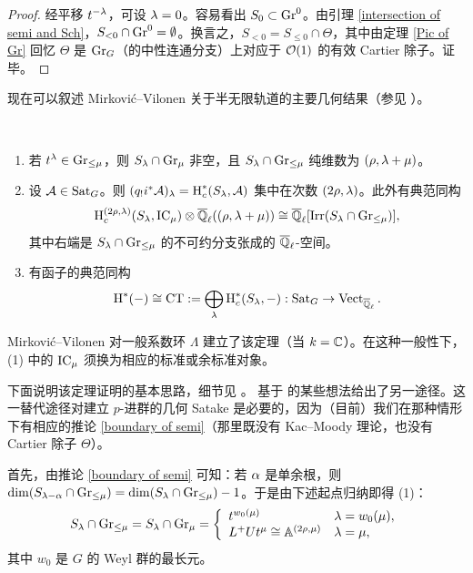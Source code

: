 \begin{proof}
经平移 $t^{-{\lambda}}$，可设 ${\lambda}=0$。容易看出 $S_0\subset {\operatorname{Gr}}^0$。由引理 \ref{intersection of semi and Sch}，$S_{<0}\cap {\operatorname{Gr}}^0=\emptyset$。换言之，$S_{<0}=S_{\leq 0}\cap \Theta$，其中由定理 \ref{Pic of Gr} 回忆 $\Theta$ 是 ${\operatorname{Gr}}_G$（的中性连通分支）上对应于 ${\mathcal O}(1)$ 的有效 Cartier 除子。证毕。
\end{proof}

现在可以叙述 Mirkovi\'c--Vilonen 关于半无限轨道的主要几何结果（参见 \cite[\S\ 3]{MV}）。

\begin{thm}\label{MV theory}~
\begin{enumerate}
\item 若 $t^{\lambda}\in {\operatorname{Gr}}_{\leq \mu}$，则 $S_{\lambda}\cap {\operatorname{Gr}}_\mu$ 非空，且 $S_{\lambda} \cap {\operatorname{Gr}}_{\leq \mu}$ 纯维数为 $(\rho,{\lambda}+\mu)$。

\item 设 ${\mathcal A}\in{\operatorname{Sat}}_G$。则 $(q_!i^*{\mathcal A})_{\lambda}=\operatorname{H}_c^*(S_{\lambda}, {\mathcal A})$ 集中在次数 $(2\rho,{\lambda})$。此外有典范同构
\[\operatorname{H}_c^{(2\rho,{\lambda})}(S_{\lambda}, {\operatorname{IC}}_\mu)\otimes{\overline{{\mathbb Q}}_\ell}((\rho,{\lambda}+\mu))\cong {\overline{{\mathbb Q}}_\ell}[\operatorname{Irr}(S_{\lambda}\cap{\operatorname{Gr}}_{\leq \mu})],\]
其中右端是 $S_{\lambda}\cap{\operatorname{Gr}}_{\leq \mu}$ 的不可约分支张成的 ${\overline{{\mathbb Q}}_\ell}$-空间。

\item 有函子的典范同构
\[\operatorname{H}^*(-)\cong \operatorname{CT}:=\bigoplus_{\lambda} \operatorname{H}_c^*(S_{\lambda},-):{\operatorname{Sat}}_G\to \operatorname{Vect}_{{\overline{{\mathbb Q}}_\ell}}.\]
\end{enumerate}
\end{thm}

\begin{rmk}
Mirkovi\'c--Vilonen 对一般系数环 $\Lambda$ 建立了该定理（当 $k={\mathbb C}$）。在这种一般性下，(1) 中的 ${\operatorname{IC}}_\mu$ 须换为相应的标准或余标准对象。
\end{rmk}

下面说明该定理证明的基本思路，细节见 \cite[\S\ 3]{MV}。\cite[\S~2.2]{Z14} 基于 \cite{NP} 的某些想法给出了另一途径。这一替代途径对建立 $p$-进群的几何 Satake 是必要的，因为（目前）我们在那种情形下有相应的推论 \ref{boundary of semi}（那里既没有 Kac--Moody 理论，也没有 Cartier 除子 $\Theta$）。

首先，由推论 \ref{boundary of semi} 可知：若 ${\alpha}$ 是单余根，则 $\dim(S_{{\lambda}-{\alpha}}\cap{\operatorname{Gr}}_{\leq \mu})=\dim(S_{\lambda}\cap{\operatorname{Gr}}_{\leq \mu})-1$。于是由下述起点归纳即得 (1)：
\begin{equation}\label{extreme semi}
S_{\lambda}\cap {\operatorname{Gr}}_{\leq \mu}=S_{\lambda}\cap {\operatorname{Gr}}_\mu=\left\{\begin{array}{ll}t^{w_0(\mu)} & {\lambda}=w_0(\mu), \\
                               L^+U t^\mu\cong {\mathbb A}^{(2\rho,\mu)} & {\lambda}=\mu, \end{array}\right.
\end{equation}
其中 $w_0$ 是 $G$ 的 Weyl 群的最长元。

